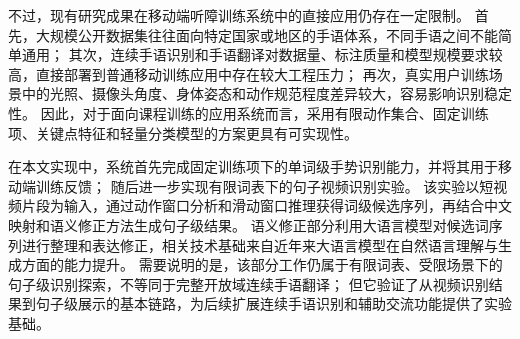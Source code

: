 不过，现有研究成果在移动端听障训练系统中的直接应用仍存在一定限制。
首先，大规模公开数据集往往面向特定国家或地区的手语体系，不同手语之间不能简单通用；
其次，连续手语识别和手语翻译对数据量、标注质量和模型规模要求较高，直接部署到普通移动训练应用中存在较大工程压力；
再次，真实用户训练场景中的光照、摄像头角度、身体姿态和动作规范程度差异较大，容易影响识别稳定性。
因此，对于面向课程训练的应用系统而言，采用有限动作集合、固定训练项、关键点特征和轻量分类模型的方案更具有可实现性。

在本文实现中，系统首先完成固定训练项下的单词级手势识别能力，并将其用于移动端训练反馈；
随后进一步实现有限词表下的句子视频识别实验。
该实验以短视频片段为输入，通过动作窗口分析和滑动窗口推理获得词级候选序列，再结合中文映射和语义修正方法生成句子级结果。
语义修正部分利用大语言模型对候选词序列进行整理和表达修正，相关技术基础来自近年来大语言模型在自然语言理解与生成方面的能力提升\cite{deepseek-v3-2024}。
需要说明的是，该部分工作仍属于有限词表、受限场景下的句子级识别探索，不等同于完整开放域连续手语翻译；
但它验证了从视频识别结果到句子级展示的基本链路，为后续扩展连续手语识别和辅助交流功能提供了实验基础。
